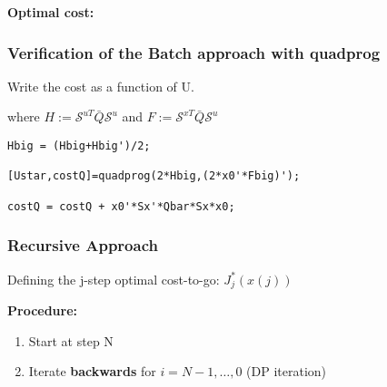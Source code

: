 \documentclass[8pt,a4paper]{scrartcl}
\begin{document}
\begin{multicols*}{3}
\textbf{Optimal cost:}


\subsubsection{Verification of the Batch approach with quadprog}

Write the cost as a function of U.


where $H:=\mathcal{S}^{uT}\bar{Q}\mathcal{S}^u$ and $F:=\mathcal{S}^{xT}\bar{Q}\mathcal{S}^u$

\begin{verbatim}
Hbig = (Hbig+Hbig')/2;

[Ustar,costQ]=quadprog(2*Hbig,(2*x0'*Fbig)');

costQ = costQ + x0'*Sx'*Qbar*Sx*x0;

\end{verbatim}

\subsubsection{Recursive Approach}

Defining the j-step optimal cost-to-go: $J_j^\ast(x(j))$





\textbf{Procedure:}

\begin{enumerate}
\ncompaq
\item Start at step N

\item Iterate \textbf{backwards} for $i=N-1,\ldots, 0$ (DP iteration)


\end{enumerate}
\end{multicols*}
\end{document}
